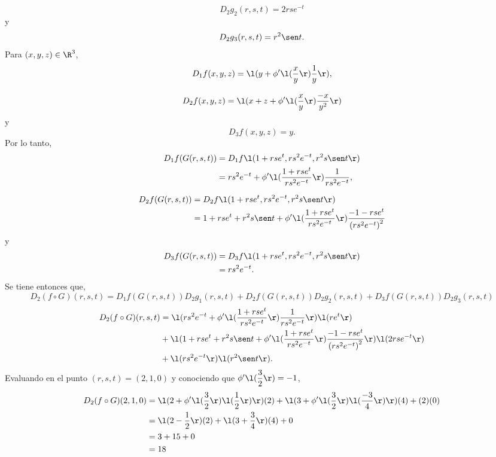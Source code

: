 \documentclass[a4,11pt]{aleph-examen}
\begin{document}
\begin{preguntas}
\begin{respuesta}
\begin{respuesta}
\begin{respuesta}
    \[
	    D_2g_2(r,s,t)=2rse^{-t}
    \]
    y
    \[
	    D_2g_3(r,s,t)=r^2 \sen t.
    \]
    Para $(x,y,z) \in \R^3$,
    \[
	    D_1f(x,y,z)=\l(y + \phi' \l( \dfrac{x}{y} \r) \dfrac{1}{y}\r),
    \]
    
    \[
	    D_2f(x,y,z)=\l(x+z+ \phi' \l( \dfrac{x}{y} \r) \dfrac{-x}{y^2}\r)
    \]
    y
    \[
	    D_3f(x,y,z)=y.
    \]
    Por lo tanto,
    \[
        \begin{aligned}
        D_1f(G(r,s,t))&= D_1f\l(1+rse^t,rs^2e^{-t},r^2s \sen t\r)\\&=rs^2e^{-t} + \phi' \l( \dfrac{1+rse^t}{rs^2e^{-t}} \r) \dfrac{1}{rs^2e^{-t}},
        \end{aligned}
    \]
    
	\[
        \begin{aligned}
	    D_2f(G(r,s,t))&= D_2f\l(1+rse^t,rs^2e^{-t},r^2s \sen t\r)\\&=1+rse^t + r^2s \sen t + \phi' \l( \dfrac{1+rse^t}{rs^2e^{-t}} \r) \dfrac{-1-rse^t}{\left(rs^2e^{-t}\right)^2}
        \end{aligned}
    \]
    y
	\[
        \begin{aligned}
	    D_3f(G(r,s,t))&= D_3f\l(1+rse^t,rs^2e^{-t},r^2s \sen t\r)\\&=rs^2e^{-t}.
        \end{aligned}
    \]
    Se tiene entonces que,
	\[
	    D_2(f \circ G)(r,s,t)=D_1f(G(r,s,t))D_2g_1(r,s,t)+D_2f(G(r,s,t))D_2g_2(r,s,t)+D_3f(G(r,s,t))D_2g_3(r,s,t)
    \]
    \[
        \begin{aligned}
	    D_2(f \circ G)(r,s,t)&=\l(rs^2e^{-t} + \phi' \l( \dfrac{1+rse^t}{rs^2e^{-t}} \r) \dfrac{1}{rs^2e^{-t}}\r) \l(re^t\r) \\ &+ \l(1+rse^t + r^2s \sen t + \phi' \l( \dfrac{1+rse^t}{rs^2e^{-t}} \r) \dfrac{-1-rse^t}{\left(rs^2e^{-t}\right)^2}\r) \l(2rse^{-t}\r) \\ &+ \l(rs^2e^{-t}\r) \l(r^2 \sen t\r).
        \end{aligned}
    \]
    Evaluando en el punto $(r,s,t)=(2,1,0)$ y conociendo que $\phi' \l(\dfrac{3}{2}\r)=-1 $,
    \[
        \begin{aligned}
	    D_2(f \circ G)(2,1,0)&=\l(2+\phi' \l( \dfrac{3}{2}\r) \l(\dfrac{1}{2}\r)\r)(2) + \l(3+ \phi' \l( \dfrac{3}{2}\r)\l(\dfrac{-3}{4}\r)\r)(4) + (2)(0)\\
        &=\l(2- \dfrac{1}{2}\r)(2) + \l(3+ \dfrac{3}{4}\r)(4) + 0\\
        &=3+15+0\\
        &=18
        \end{aligned}
    \]
\end{respuesta}


\end{respuesta}
\end{respuesta}
\end{preguntas}
\end{document}
